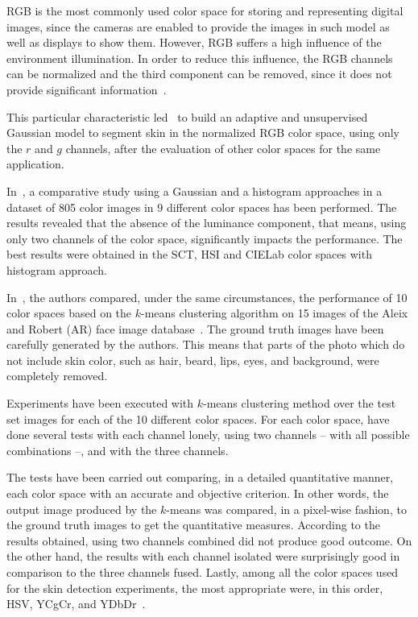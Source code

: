 RGB is the most commonly used color space for storing and representing digital images, since the cameras are enabled to provide the images in such model as well as displays to show them. However, RGB suffers a high influence of the environment illumination. In order to reduce this influence, the RGB channels can be normalized and the third component can be removed, since it does not provide significant information~\citep{kakumanu:07}.

This particular characteristic led~\citet{bergasa:00} to build an adaptive and unsupervised Gaussian model to segment skin in the normalized RGB color space, using only the $r$ and $g$ channels, after the evaluation of other color spaces for the same application.

In~\citet{jayaram:04}, a comparative study using a Gaussian and a histogram approaches in a dataset of 805 color images in 9 different color spaces has been performed. The results revealed that the absence of the luminance component, that means, using only two channels of the color space, significantly impacts the performance. The best results were obtained in the SCT, HSI and CIELab color spaces with histogram approach.

In~\citet{chaves:10}, the authors compared, under the same circumstances, the performance of 10 color spaces based on the $k$-means clustering algorithm on 15 images of the Aleix and Robert (AR) face image database~\citep{ar-face-database:98}. The ground truth images have been carefully generated by the authors. This means that parts of the photo which do not include skin color, such as hair, beard, lips, eyes, and background, were completely removed.

Experiments have been executed with $k$-means clustering method over the test set images for each of the 10 different color spaces. For each color space, \citet{chaves:10} have done several tests with each channel lonely, using two channels -- with all possible combinations --, and with the three channels.

The tests have been carried out comparing, in a detailed quantitative manner, each color space with an accurate and objective criterion. In other words, the output image produced by the $k$-means was compared, in a pixel-wise fashion, to the ground truth images to get the quantitative measures. According to the results obtained, using two channels combined did not produce good outcome. On the other hand, the results with each channel isolated were surprisingly good in comparison to the three channels fused. Lastly, among all the color spaces used for the skin detection experiments, the most appropriate were, in this order, HSV, YCgCr, and YDbDr~\citep{chaves:10}.

